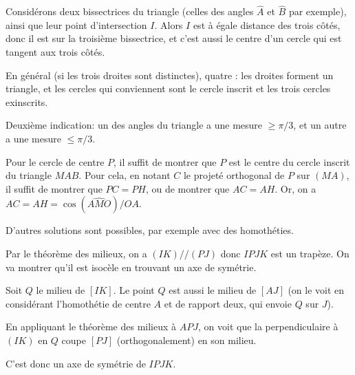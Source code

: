\begin{Soln}{86}
Considérons deux bissectrices du triangle (celles des angles $\widehat A$ et $\widehat B$ par exemple), ainsi que leur point d'intersection $I$. Alors $I$ est à égale distance des trois côtés, donc il est sur la troisième bissectrice, et c'est aussi le centre d'un cercle qui est tangent aux trois côtés.


\end{Soln}
\begin{Soln}{88}
En général (si les trois droites sont distinctes), quatre : les droites forment un triangle, et les cercles qui conviennent sont le cercle inscrit et les trois cercles exinscrits.
\end{Soln}
\begin{Soln}{90}
Deuxième indication: un des angles du triangle a une mesure $\geq \pi/3$, et un autre a une mesure $\leq \pi/3$.
\end{Soln}
\begin{Soln}{94}
Pour le cercle de centre $P$, il suffit de montrer que $P$ est le centre du cercle inscrit du triangle $MAB$. Pour cela, en notant $C$ le projeté orthogonal de $P$ sur $(MA)$, il suffit de montrer que $PC=PH$, ou de montrer que $AC=AH$. Or, on a $AC=AH = \cos(\widehat{AMO}) / OA$.

D'autres solutions sont possibles, par exemple avec des homothéties.
\end{Soln}
\begin{Soln}{95}

Par le théorème des milieux, on a $(IK) // (PJ)$ donc $IPJK$ est un trapèze. On va montrer qu'il est isocèle en trouvant un axe de symétrie.

Soit $Q$ le milieu de $[IK]$. Le point $Q$ est aussi le milieu de $[AJ]$ (on le voit en considérant l'homothétie de centre $A$ et de rapport deux, qui envoie $Q$ sur $J$).

En appliquant le théorème des milieux à $APJ$, on voit que la perpendiculaire à $(IK)$ en $Q$ coupe $[PJ]$ (orthogonalement) en son milieu.

C'est donc un axe de symétrie de $IPJK$.
\end{Soln}
